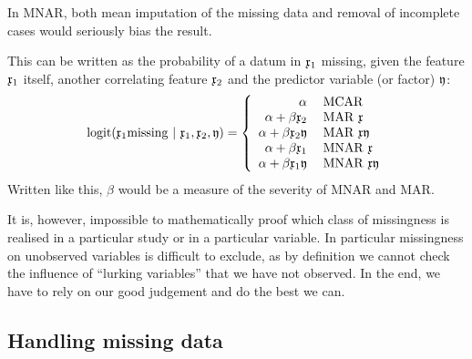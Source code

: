 \begin{refsection}
\begin{description}
{\begin{description}
      \end{description}
      In \acs{MNAR}, both mean imputation of the missing data and removal of incomplete cases would seriously bias the result. }
\end{description}
This can be written as the probability of a datum in \(\mathfrak{x}_1 \) missing, given the feature \(\mathfrak{x}_1 \) itself, another correlating feature \(\mathfrak{x}_2 \) and the predictor variable (or factor) \(\mathfrak{y} \):
\begin{equation}
  \logit(\AbsVec{x}_1 \mathrm{missing}\ |\ \AbsVec{x}_1, \AbsVec{x}_2, \AbsVec{y}) =
  \left\{
  \begin{array}{r@{\;}l}
    \alpha                                 &\quad \mathrm{MCAR}              \\
    \alpha + \beta \AbsVec{x}_2            &\quad \mathrm{MAR}\ \AbsVec{x}   \\
    \alpha + \beta \AbsVec{x}_2 \AbsVec{y} &\quad \mathrm{MAR}\ \AbsVec{xy}  \\
    \alpha + \beta \AbsVec{x}_1            &\quad \mathrm{MNAR}\ \AbsVec{x}  \\
    \alpha + \beta \AbsVec{x}_1 \AbsVec{y} &\quad \mathrm{MNAR}\ \AbsVec{xy} \\
  \end{array}
  \right.
\end{equation}
Written like this, \(\beta \) would be a measure of the severity of \acs{MNAR} and \acs{MAR}.

It is, however, impossible to mathematically proof which class of missingness is realised in a particular study or in a particular variable. In particular missingness on unobserved variables is difficult to exclude, as by definition we cannot check the influence of ``lurking variables'' that we have not observed. In the end, we have to rely on our good judgement and do the best we can.

\subsection{Handling missing data}\label{text:HandMiss}


\end{refsection}
